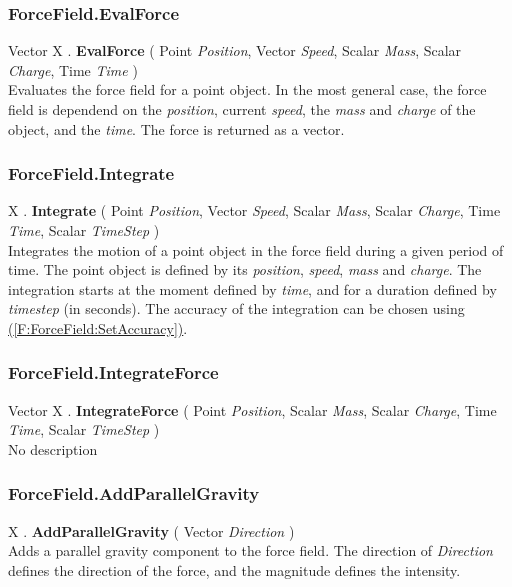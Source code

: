 \documentclass[10pt]{book}
\newcommand{\linkitem}[1]{\hyperref[#1]{\nameref{#1} (\ref{#1})}}
\newcommand{\var}[1]{\textit{#1}}
\begin{document}
\subsubsection{ForceField.EvalForce \label{F:ForceField:EvalForce}}
Vector X . \textbf{EvalForce} ( Point \textit{Position}, Vector \textit{Speed}, Scalar \textit{Mass}, Scalar \textit{Charge}, Time \textit{Time} ) \\
Evaluates the force field for a point object. In the most general case, the force field is dependend on the \var{position}, current \var{speed}, the \var{mass} and \var{charge} of the object, and the \var{time}. The force is returned as a vector.

\subsubsection{ForceField.Integrate \label{F:ForceField:Integrate}}
X . \textbf{Integrate} ( Point \textit{Position}, Vector \textit{Speed}, Scalar \textit{Mass}, Scalar \textit{Charge}, Time \textit{Time}, Scalar \textit{TimeStep} ) \\
Integrates the motion of a point object in the force field during a given period of time. The point object is defined by its \var{position}, \var{speed}, \var{mass} and \var{charge}. The integration starts at the moment defined by \var{time}, and for a duration defined by \var{timestep} (in seconds). The accuracy of the integration can be chosen using \linkitem{F:ForceField:SetAccuracy}.

\subsubsection{ForceField.IntegrateForce \label{F:ForceField:IntegrateForce}}
Vector X . \textbf{IntegrateForce} ( Point \textit{Position}, Scalar \textit{Mass}, Scalar \textit{Charge}, Time \textit{Time}, Scalar \textit{TimeStep} ) \\
No description

\subsubsection{ForceField.AddParallelGravity \label{F:ForceField:AddParallelGravity}}
X . \textbf{AddParallelGravity} ( Vector \textit{Direction} ) \\
Adds a parallel gravity component to the force field. The direction of \var{Direction} defines the direction of the force, and the magnitude defines the intensity.
\end{document}
